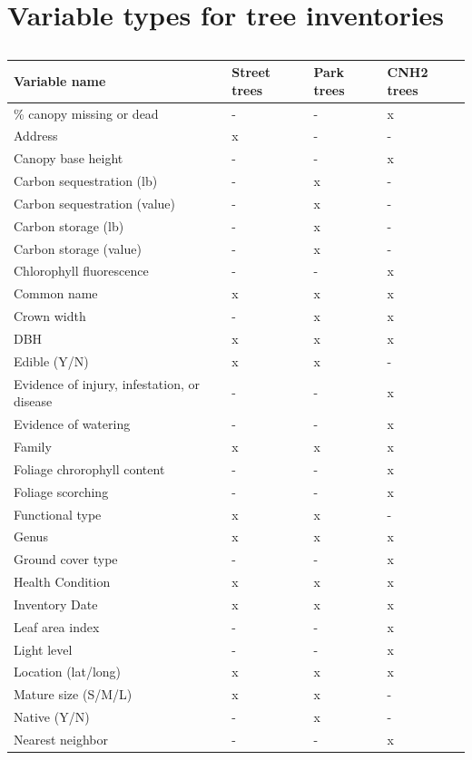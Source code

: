 \documentclass[12pt,twoside]{reedthesis}
\begin{document}
\hypertarget{variable-types-for-tree-inventories}{%
\section{Variable types for tree inventories}\label{variable-types-for-tree-inventories}}
\begin{longtable}[t]{llll}
\caption{\label{tab:var-type-table}}\\
\toprule
Variable name & Street trees & Park trees & CNH2 trees\\
\midrule
\% canopy missing or dead & - & - & x\\
Address & x & - & -\\
Canopy base height & - & - & x\\
Carbon sequestration (lb) & - & x & -\\
Carbon sequestration (value) & - & x & -\\
\addlinespace
Carbon storage (lb) & - & x & -\\
Carbon storage (value) & - & x & -\\
Chlorophyll fluorescence & - & - & x\\
Common name & x & x & x\\
Crown width & - & x & x\\
\addlinespace
DBH & x & x & x\\
Edible (Y/N) & x & x & -\\
Evidence of injury, infestation, or disease & - & - & x\\
Evidence of watering & - & - & x\\
Family & x & x & x\\
\addlinespace
Foliage chrorophyll content & - & - & x\\
Foliage scorching & - & - & x\\
Functional type & x & x & -\\
Genus & x & x & x\\
Ground cover type & - & - & x\\
\addlinespace
Health Condition & x & x & x\\
Inventory Date & x & x & x\\
Leaf area index & - & - & x\\
Light level & - & - & x\\
Location (lat/long) & x & x & x\\
\addlinespace
Mature size (S/M/L) & x & x & -\\
Native (Y/N) & - & x & -\\
Nearest neighbor & - & - & x\\

\end{longtable}
\end{document}
